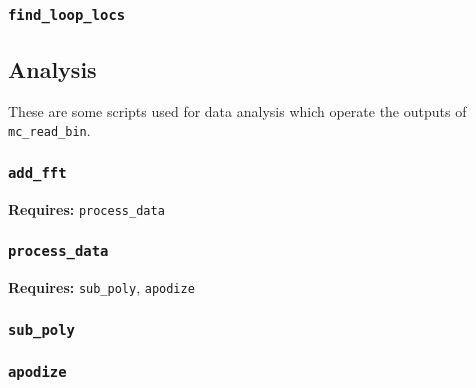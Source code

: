 \documentclass[../PaulGanssle-Thesis.tex]{subfiles}
\begin{document}
\subsubsection{\texttt{find\_loop\_locs}}
\label{matlab.scripts.bsf.findlooplocs}


\subsection{Analysis}
\label{matlab.scripts.bsf.analysis}
These are some scripts used for data analysis which operate the outputs of \texttt{mc\_read\_bin}.
\subsubsection{\texttt{add\_fft}}
\label{matlab.scripts.bsf.addfft}
\textbf{Requires:} \texttt{process\_data}


\subsubsection{\texttt{process\_data}}
\label{matlab.scripts.bsf.processdata}
\textbf{Requires:} \texttt{sub\_poly}, \texttt{apodize}


\subsubsection{\texttt{sub\_poly}}
\label{matlab.scripts.bsf.subpoly}


\subsubsection{\texttt{apodize}}
\label{matlab.scripts.bsf.apodize}

\end{document}
